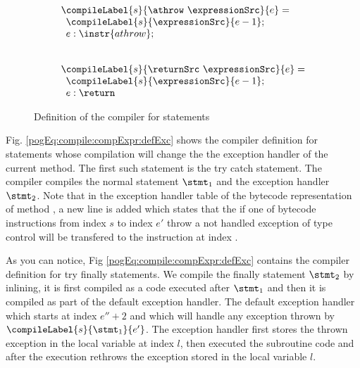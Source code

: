 \begin{figure}[ht!]
\begin{frameit}
$${\begin{array}{l}
	\compileLabel{s}{\athrow \ \expressionSrc}{e} = \\
             \begin{array}{l} 
	           \compileLabel{s}{ \expressionSrc}{e - 1}; \\
	           e: \instr{athrow}; 
	        \end{array} \\
		\\ \\
	\compileLabel{s}{\returnSrc  \  \expressionSrc }{e } =  \\
	\begin{array}{l} 
	      \compileLabel{s}{ \expressionSrc }{e - 1};\\
	      e : \return
	\end{array} 

	\end{array} 
} $$

\caption{\sc Definition of the compiler for statements }
\label{pogEq:compile:compExpr:defStmt}
\end{frameit}
\end{figure}

Fig. \ref{pogEq:compile:compExpr:defExc} shows the compiler definition for statements whose compilation will
change the  the exception handler of the current method.
The first such statement  is the try catch statement.
The compiler compiles the normal statement $\stmt_1$ and the exception handler $\stmt_2$.
Note that in the exception handler table of the bytecode representation of method \methodd, a new line is added 
which states that the if one of bytecode instructions from index $s$ to index $e'$  throw a not handled exception of type  \excType
control will be transfered to the instruction at index \excType.

As you can notice, Fig \ref{pogEq:compile:compExpr:defExc} contains the compiler definition for try finally statements. 
We compile the finally statement $ \stmt_2 $ by inlining, it is first compiled as a code executed after $\stmt_1  $  and
then it is compiled as part of the default exception handler. The default exception handler which starts at index $e'' + 2 $ and 
which will  handle any exception thrown by $\compileLabel{s}{\stmt_1}{e'}$. The exception handler 
first stores the thrown exception in the local variable at index $l$, then executed the subroutine code and after the execution rethrows the exception 
stored in the local variable $l$. 

